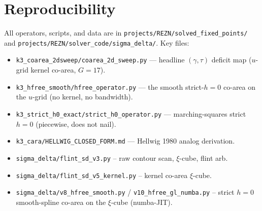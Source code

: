 \documentclass[11pt]{article}
\begin{document}
\section{Reproducibility}
All operators, scripts, and data are in
\texttt{projects/REZN/solved\_fixed\_points/} and
\texttt{projects/REZN/solver\_code/sigma\_delta/}. Key files:
\begin{itemize}
\item \texttt{k3\_coarea\_2dsweep/coarea\_2d\_sweep.py} --- headline $(\gamma,\tau)$ deficit map
($u$-grid kernel co-area, $G{=}17$).
\item \texttt{k3\_hfree\_smooth/hfree\_operator.py} --- the smooth strict-$h{=}0$ co-area on the
$u$-grid (no kernel, no bandwidth).
\item \texttt{k3\_strict\_h0\_exact/strict\_h0\_operator.py} --- marching-squares strict $h{=}0$
(piecewise, does not nail).
\item \texttt{k3\_cara/HELLWIG\_CLOSED\_FORM.md} --- Hellwig 1980 analog derivation.
\item \texttt{sigma\_delta/flint\_sd\_v3.py} -- raw contour scan, $\xi$-cube, flint arb.
\item \texttt{sigma\_delta/flint\_sd\_v5\_kernel.py} -- kernel co-area $\xi$-cube.
\item \texttt{sigma\_delta/v8\_hfree\_smooth.py} / \texttt{v10\_hfree\_gl\_numba.py} -- strict
$h{=}0$ smooth-spline co-area on the $\xi$-cube (numba-JIT).
\end{itemize}
\end{document}
